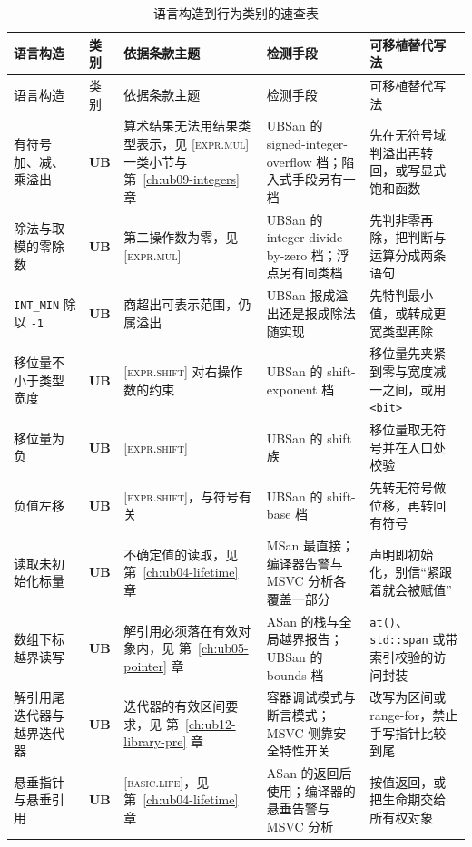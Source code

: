 \documentclass[12pt,a4paper,fontset=fandol]{ctexbook}
\newcommand{\Fn}[1]{\texttt{#1()}}
\newcommand{\Tp}[1]{\texttt{#1}}
\newcommand{\Bk}{\discretionary{}{}{}}
\newcommand{\UB}{\textbf{\textsf{UB}}}
\newcommand{\Std}[1]{\textsc{[#1]}}
\newcommand{\Hdr}[1]{\texttt{<#1>}}
\newcommand{\Mx}[1]{\textsf{#1}}
\begin{document}
\begin{longtable}{@{}>{\raggedright\arraybackslash}p{} >{\raggedright\arraybackslash}p{} >{\raggedright\arraybackslash}p{} >{\raggedright\arraybackslash}p{} >{\raggedright\arraybackslash}p{}@{}}
\caption{语言构造到行为类别的速查表}\label{tab:apA-kinds}\\
\toprule
语言构造 & 类别 & 依据条款主题 & 检测手段 & 可移植替代写法 \\
\midrule
\endfirsthead
\toprule
语言构造 & 类别 & 依据条款主题 & 检测手段 & 可移植替代写法 \\
\midrule
\endhead
\bottomrule
\endfoot
有符号加、减、乘溢出 & \UB{} & 算术结果无法用结果类型表示，见 \Std{expr{\Bk}.mul} 一类小节与第~\ref{ch:ub09-integers} 章 & \Mx{UBSan} 的 signed-integer-overflow 档；陷入式手段另有一档 & 先在无符号域判溢出再转回，或写显式饱和函数 \\
除法与取模的零除数 & \UB{} & 第二操作数为零，见 \Std{expr{\Bk}.mul} & \Mx{UBSan} 的 integer-divide-by-zero 档；浮点另有同类档 & 先判非零再除，把判断与运算分成两条语句 \\
\Tp{INT{\Bk}\_MIN} 除以 \Tp{-1} & \UB{} & 商超出可表示范围，仍属溢出 & \Mx{UBSan} 报成溢出还是报成除法随实现 & 先特判最小值，或转成更宽类型再除 \\
移位量不小于类型宽度 & \UB{} & \Std{expr{\Bk}.shift} 对右操作数的约束 & \Mx{UBSan} 的 shift-exponent 档 & 移位量先夹紧到零与宽度减一之间，或用 \Hdr{bit} \\
移位量为负 & \UB{} & \Std{expr{\Bk}.shift} & \Mx{UBSan} 的 shift 族 & 移位量取无符号并在入口处校验 \\
负值左移 & \UB{} & \Std{expr{\Bk}.shift}，与符号有关 & \Mx{UBSan} 的 shift-base 档 & 先转无符号做位移，再转回有符号 \\
读取未初始化标量 & \UB{} & 不确定值的读取，见 第~\ref{ch:ub04-lifetime} 章 & \Mx{MSan} 最直接；编译器告警与 \Mx{MSVC} 分析各覆盖一部分 & 声明即初始化，别信“紧跟着就会被赋值” \\
数组下标越界读写 & \UB{} & 解引用必须落在有效对象内，见 第~\ref{ch:ub05-pointer} 章 & \Mx{ASan} 的栈与全局越界报告；\Mx{UBSan} 的 bounds 档 & \Fn{at}、\Tp{std::{\Bk}span} 或带索引校验的访问封装 \\
解引用尾迭代器与越界迭代器 & \UB{} & 迭代器的有效区间要求，见 第~\ref{ch:ub12-library-pre} 章 & 容器调试模式与断言模式；\Mx{MSVC} 侧靠安全特性开关 & 改写为区间或 range-for，禁止手写指针比较到尾 \\
悬垂指针与悬垂引用 & \UB{} & \Std{basic{\Bk}.life}，见 第~\ref{ch:ub04-lifetime} 章 & \Mx{ASan} 的返回后使用；编译器的悬垂告警与 \Mx{MSVC} 分析 & 按值返回，或把生命期交给所有权对象 \\

\end{longtable}
\end{document}
